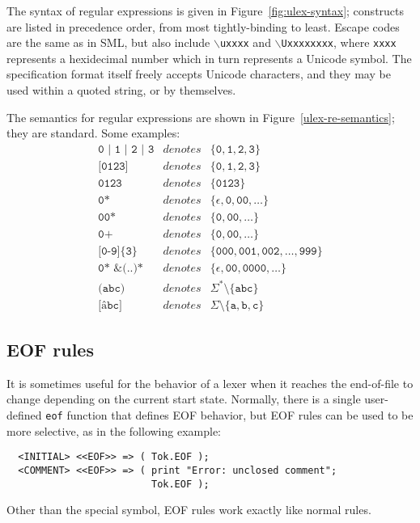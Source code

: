 The syntax of regular expressions is given in Figure~\ref{fig:ulex-syntax}; constructs are listed in precedence order, from most tightly-binding to least.  Escape codes are the same as in SML, but also include \texttt{$\backslash$uxxxx} and \texttt{$\backslash$Uxxxxxxxx}, where \texttt{xxxx} represents a hexidecimal number which in turn represents a Unicode symbol.  The specification format itself freely accepts Unicode characters, and they may be used within a quoted string, or by themselves.

The semantics for \ulex{} regular expressions are shown in Figure~\ref{ulex-re-semantics}; they are standard.  Some examples:
\[
\begin{array}{rcl}
\texttt{0 | 1 | 2 | 3}	& \textit{denotes} &
    \{ \texttt{0}, \texttt{1}, \texttt{2}, \texttt{3} \}	\\
\texttt{[0123]}	& \textit{denotes} &
    \{ \texttt{0}, \texttt{1}, \texttt{2}, \texttt{3} \}	\\
\texttt{0123}	& \textit{denotes} &
    \{ \texttt{0123} \}						\\
\texttt{0*}	& \textit{denotes} &
    \{ \epsilon, \texttt{0}, \texttt{00}, \dots \}		\\
\texttt{00*}	& \textit{denotes} &
    \{ \texttt{0}, \texttt{00}, \dots \}		\\
\texttt{0+}	& \textit{denotes} &
    \{ \texttt{0}, \texttt{00}, \dots \}		\\
\texttt{[0-9]\{3\}}	& \textit{denotes} &
    \{ \texttt{000}, \texttt{001}, \texttt{002}, \dots, \texttt{999} \}	\\
\texttt{0* \& (..)*}	& \textit{denotes} &
    \{ \epsilon, \texttt{00}, \texttt{0000}, \dots \}	\\
\texttt{\^{ }(abc)}	& \textit{denotes} &
    \Sigma^* \setminus \{ \texttt{abc} \}	\\
\texttt{[\^{ }abc]}	& \textit{denotes} &
    \Sigma \setminus \{ \texttt{a}, \texttt{b}, \texttt{c} \}
\end{array}
\]

\subsection{EOF rules}\label{sec:eof-rules}

It is sometimes useful for the behavior of a lexer when it reaches the end-of-file to change depending on the current start state.  Normally, there is a single user-defined \texttt{eof} function that defines EOF behavior, but EOF rules can be used to be more selective, as in the following example:
\begin{verbatim}
  <INITIAL> <<EOF>> => ( Tok.EOF );
  <COMMENT> <<EOF>> => ( print "Error: unclosed comment";
                         Tok.EOF );
\end{verbatim}
Other than the special  symbol, EOF rules work exactly like normal rules.

